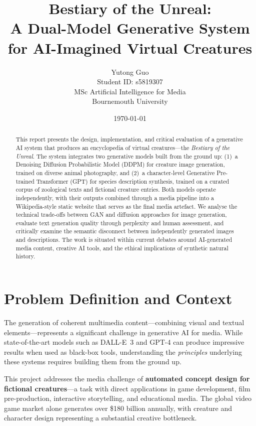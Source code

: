 \documentclass[12pt,a4paper]{article}
\title{Bestiary of the Unreal:\\
A Dual-Model Generative System for AI-Imagined Virtual Creatures}
\author{Yutong Guo\\
Student ID: s5819307\\
MSc Artificial Intelligence for Media\\
Bournemouth University}
\date{\today}
\begin{document}
\maketitle

\begin{abstract}
This report presents the design, implementation, and critical evaluation of a generative AI system that produces an encyclopedia of virtual creatures---the \emph{Bestiary of the Unreal}. The system integrates two generative models built from the ground up: (1)~a Denoising Diffusion Probabilistic Model (DDPM) for creature image generation, trained on diverse animal photography, and (2)~a character-level Generative Pre-trained Transformer (GPT) for species description synthesis, trained on a curated corpus of zoological texts and fictional creature entries. Both models operate independently, with their outputs combined through a media pipeline into a Wikipedia-style static website that serves as the final media artefact. We analyse the technical trade-offs between GAN and diffusion approaches for image generation, evaluate text generation quality through perplexity and human assessment, and critically examine the semantic disconnect between independently generated images and descriptions. The work is situated within current debates around AI-generated media content, creative AI tools, and the ethical implications of synthetic natural history.
\end{abstract}

\tableofcontents
\newpage

\section{Problem Definition and Context}
\label{sec:problem}

The generation of coherent multimedia content---combining visual and textual elements---represents a significant challenge in generative AI for media. While state-of-the-art models such as DALL-E~3 and GPT-4 can produce impressive results when used as black-box tools, understanding the \emph{principles} underlying these systems requires building them from the ground up.

This project addresses the media challenge of \textbf{automated concept design for fictional creatures}---a task with direct applications in game development, film pre-production, interactive storytelling, and educational media. The global video game market alone generates over \$180 billion annually, with creature and character design representing a substantial creative bottleneck.
\end{document}
